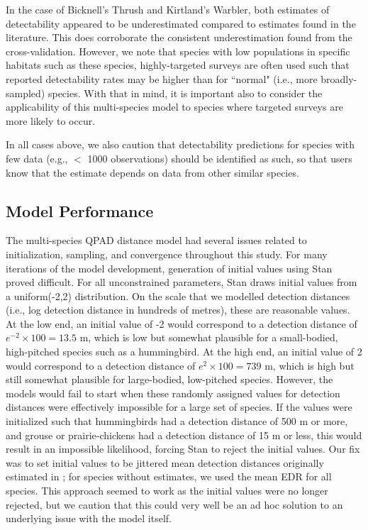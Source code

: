 \par In the case of Bicknell's Thrush and Kirtland's Warbler, both estimates of detectability appeared to be underestimated compared to estimates found in the literature.
This does corroborate the consistent underestimation found from the cross-validation.
However, we note that species with low populations in specific habitats such as these species, highly-targeted surveys are often used such that reported detectability rates may be higher than for ``normal" (i.e., more broadly-sampled) species.
With that in mind, it is important also to consider the applicability of this multi-species model to species where targeted surveys are more likely to occur.

In all cases above, we also caution that detectability predictions for species with few data (e.g., $<$ 1000 observations) should be identified as such, so that users know that the estimate depends on data from other similar species.


\subsection{Model Performance}

\par The multi-species QPAD distance model had several issues related to initialization, sampling, and convergence throughout this study.
For many iterations of the model development, generation of initial values using Stan proved difficult.
For all unconstrained parameters, Stan draws initial values from a uniform(-2,2) distribution.
On the scale that we modelled detection distances (i.e., log detection distance in hundreds of metres), these are reasonable values.
At the low end, an initial value of -2 would correspond to a detection distance of $e^{-2} \times 100 = 13.5$ m, which is low but somewhat plausible for a small-bodied, high-pitched species such as a hummingbird.
At the high end, an initial value of 2 would correspond to a detection distance of $e^{2} \times 100 = 739$ m, which is high but still somewhat plausible for large-bodied, low-pitched species.
However, the models would fail to start when these randomly assigned values for detection distances were effectively impossible for a large set of species.
If the values were initialized such that hummingbirds had a detection distance of 500 m or more, and grouse or prairie-chickens had a detection distance of 15 m or less, this would result in an impossible likelihood, forcing Stan to reject the initial values.
Our fix was to set initial values to be jittered mean detection distances originally estimated in \citet{edwards_point_2023}; for species without estimates, we used the mean EDR for all species.
This approach seemed to work as the initial values were no longer rejected, but we caution that this could very well be an ad hoc solution to an underlying issue with the model itself.

